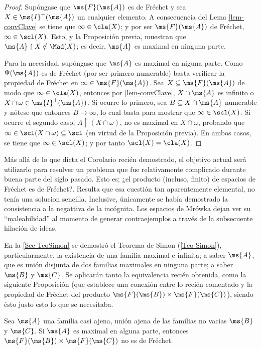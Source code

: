 	\begin{proof} 
		Supóngase que $\ms{F}(\ms{A})$ es de Fréchet y sea $X \in \ms{I}^+(\ms{A})$ un cualquier elemento. A consecuencia del Lema \ref{lem-convClave} se tiene que $\infty \in \cla(X)$; y por ser $\ms{F}(\ms{A})$ de Fréchet, $\infty \in \scl(X)$. Esto, y la Proposición previa, muestran que $\ms{A} \upharpoonright X \notin \Mad(X)$; es decir, $\ms{A}$ es maximal en ninguna parte.

		Para la necesidad, supóngase que $\ms{A}$ es maximal en niguna parte. Como $\Psi(\ms{A})$ es de Fréchet (por ser primero numerable) basta verificar la propiedad de Fréchet en $\infty \in \ms{F}(\ms{A})$. Sea $X \subseteq \ms{F}(\ms{A})$ de modo que $\infty \in \cla(X)$, entonces por \ref{lem-convClave}, $X \cap \ms{A}$ es infinito o $X \cap \omega \in \ms{I}^+(\ms{A})$. Si ocurre lo primero, sea $B \subseteq X \cap \ms{A}$ numerable y nótese que entonces $B \to \infty$, lo cual basta para mostrar que $\infty \in \scl(X)$. Si ocurre el segundo caso, $A \upharpoonright (X \cap \omega)$, no es maximal en $X \cap \omega$, probando que $\infty \in \scl(X \cap \omega) \subseteq \scl$ (en virtud de la Proposición previa). En ambos casos, se tiene que $\infty \in \scl(X)$; y por tanto $\scl(X)=\cla(X)$.
	\end{proof}

	Más allá de lo que dicta el Corolario recién demostrado, el objetivo actual será utilizarlo para resulver un problema que fue relativamente complicado durante buena parte del siglo pasado. Esto es; ¿el producto (incluso, finito) de espacios de Fréchet es de Fréchet?. Resulta que esa cuestión tan aparentemente elemental, no tenía una solucion  sencilla. Inclusive, únicamente se había demostrado la consistencia a la negattiva de la incógnita. Los espacios de Mrówka dejan ver su ``maleabilidad'' al momento de generar contraejemplos a través de la subsecuente hilación de ideas.

	En la \autoref{Sec-TeoSimon} se demostró el Teorema de Simon (\ref{Teo-Simon}), particularmente, la existencia de una familia maximal e infinita; a saber $\ms{A}$, que es unión disjunta de dos familias maximales en ninguna parte; a saber $\ms{B}$ y $\ms{C}$. Se aplicarán tanto la equivalencia recién obtenida, como la siguiente Proposición (que establece una conexión entre lo recién comentado y la propiedad de Fréchet del producto $\ms{F}(\ms{B}) \times \ms{F}(\ms{C})$), siendo ésto justo esto lo que se necesitaba.
	
	\begin{proposicion}
		Sea $\ms{A}$ una familia casi ajena, unión ajena de las familias no vacías $\ms{B}$ y $\ms{C}$. Si $\ms{A}$ es maximal en alguna parte, entonces $\ms{F}(\ms{B}) \times \ms{F}(\ms{C})$ no es de Fréchet.
	\end{proposicion}

